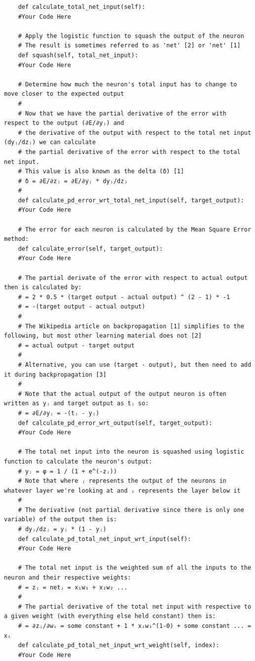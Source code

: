\documentclass[a4paper, 11pt]{article}
\begin{document}
\begin{enumerate}
\begin{lstlisting}
    def calculate_total_net_input(self):
    #Your Code Here

    # Apply the logistic function to squash the output of the neuron
    # The result is sometimes referred to as 'net' [2] or 'net' [1]
    def squash(self, total_net_input):
    #Your Code Here

    # Determine how much the neuron's total input has to change to move closer to the expected output
    #
    # Now that we have the partial derivative of the error with respect to the output (∂E/∂yⱼ) and
    # the derivative of the output with respect to the total net input (dyⱼ/dzⱼ) we can calculate
    # the partial derivative of the error with respect to the total net input.
    # This value is also known as the delta (δ) [1]
    # δ = ∂E/∂zⱼ = ∂E/∂yⱼ * dyⱼ/dzⱼ
    #
    def calculate_pd_error_wrt_total_net_input(self, target_output):
    #Your Code Here

    # The error for each neuron is calculated by the Mean Square Error method:
    def calculate_error(self, target_output):
    #Your Code Here

    # The partial derivate of the error with respect to actual output then is calculated by:
    # = 2 * 0.5 * (target output - actual output) ^ (2 - 1) * -1
    # = -(target output - actual output)
    #
    # The Wikipedia article on backpropagation [1] simplifies to the following, but most other learning material does not [2]
    # = actual output - target output
    #
    # Alternative, you can use (target - output), but then need to add it during backpropagation [3]
    #
    # Note that the actual output of the output neuron is often written as yⱼ and target output as tⱼ so:
    # = ∂E/∂yⱼ = -(tⱼ - yⱼ)
    def calculate_pd_error_wrt_output(self, target_output):
    #Your Code Here

    # The total net input into the neuron is squashed using logistic function to calculate the neuron's output:
    # yⱼ = φ = 1 / (1 + e^(-zⱼ))
    # Note that where ⱼ represents the output of the neurons in whatever layer we're looking at and ᵢ represents the layer below it
    #
    # The derivative (not partial derivative since there is only one variable) of the output then is:
    # dyⱼ/dzⱼ = yⱼ * (1 - yⱼ)
    def calculate_pd_total_net_input_wrt_input(self):
    #Your Code Here

    # The total net input is the weighted sum of all the inputs to the neuron and their respective weights:
    # = zⱼ = netⱼ = x₁w₁ + x₂w₂ ...
    #
    # The partial derivative of the total net input with respective to a given weight (with everything else held constant) then is:
    # = ∂zⱼ/∂wᵢ = some constant + 1 * xᵢw₁^(1-0) + some constant ... = xᵢ
    def calculate_pd_total_net_input_wrt_weight(self, index):
    #Your Code Here


\end{lstlisting}
\end{enumerate}
\end{document}
